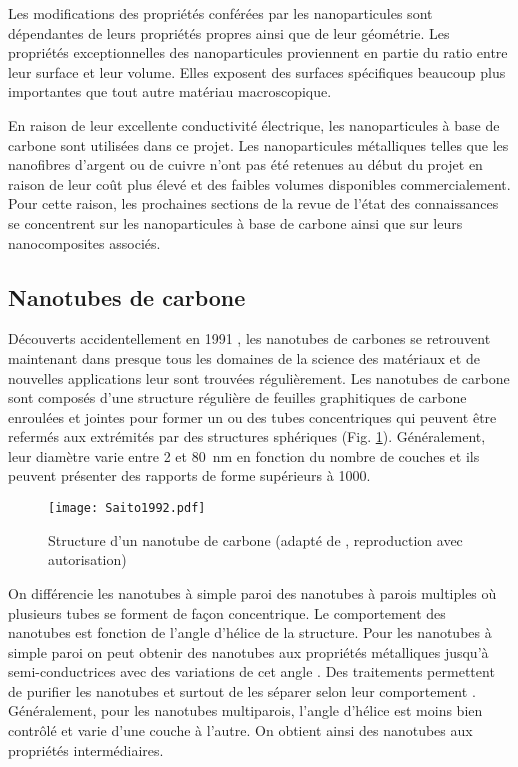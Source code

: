 Les modifications des propriétés conférées par les nanoparticules sont dépendantes de leurs propriétés propres ainsi que de leur géométrie. 
Les propriétés exceptionnelles des nanoparticules proviennent en partie du ratio entre leur surface et leur volume. 
Elles exposent des surfaces spécifiques beaucoup plus importantes que tout autre matériau macroscopique. 

En raison de leur excellente conductivité électrique, les nanoparticules à base de carbone sont utilisées dans ce projet. 
Les nanoparticules métalliques telles que les nanofibres d'argent ou de cuivre n'ont pas été retenues au début du projet en raison de leur coût plus élevé et des faibles volumes disponibles commercialement. 
Pour cette raison, les prochaines sections de la revue de l'état des connaissances se concentrent sur les nanoparticules à base de carbone ainsi que sur leurs nanocomposites associés. 

\subsection{Nanotubes de carbone}

Découverts accidentellement en 1991 \cite{iijima1991}, les nanotubes de carbones se retrouvent maintenant dans presque tous les domaines de la science des matériaux et de nouvelles applications leur sont trouvées régulièrement. 
Les nanotubes de carbone sont composés d'une structure régulière de feuilles graphitiques de carbone enroulées et jointes pour former un ou des tubes concentriques qui peuvent être refermés aux extrémités par des structures sphériques (Fig. \ref{structure_nanotube}). 
Généralement, leur diamètre varie entre 2 et \SI{80}{\nano\metre} en fonction du nombre de couches et ils peuvent présenter des rapports de forme supérieurs à 1000. 

\begin{figure}[htb]
	\centering
	\texttt{[image: Saito1992.pdf]}
	\caption{Structure d'un nanotube de carbone (adapté de \cite{Saito1992}, reproduction avec autorisation)}
	\label{structure_nanotube}
\end{figure}

On différencie les nanotubes à simple paroi des nanotubes à parois multiples où plusieurs tubes se forment de façon concentrique. 
Le comportement des nanotubes est fonction de l'angle d'hélice de la structure. 
Pour les nanotubes à simple paroi on peut obtenir des nanotubes aux propriétés métalliques jusqu'à semi-conductrices avec des variations de cet angle \cite{Saito1992}. 
Des traitements permettent de purifier les nanotubes et surtout de les séparer selon leur comportement \cite{Makama2013}. 
Généralement, pour les nanotubes multiparois, l'angle d'hélice est moins bien contrôlé et varie d'une couche à l'autre.
On obtient ainsi des nanotubes aux propriétés intermédiaires. 

